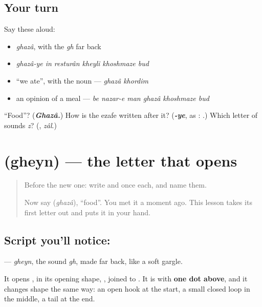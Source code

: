 \subsection*{Your turn}
Say these aloud:

\begin{itemize}
\raggedright
  \item \emph{ghazâ}, with the \emph{gh} far back
  \item \emph{ghazâ-ye in resturân kheyli khoshmaze bud}
  \item \textquotedblleft{}we ate\textquotedblright{}, with the noun — \emph{ghazâ khordim}
  \item an opinion of a meal — \emph{be nazar-e man ghazâ khoshmaze bud}
\end{itemize}

\begin{tcolorbox}[breakable,colback=teal!4,colframe=teal!35!black,title={Before you move on}]
\textquotedblleft{}Food\textquotedblright{}? (\emph{\textbf{Ghazâ.}}) How is the ezafe written after it? (\emph{\textbf{-ye}}, as \textbf{}: \textbf{}.) Which letter of \textbf{} sounds \emph{z}? (\textbf{}, \emph{zâl}.)
\end{tcolorbox}
\section[\texorpdfstring{\fa{غ} (gheyn)}{غ (gheyn)}]{ (gheyn) — the letter that opens }

\label{lesson:FA-W296-gheyn}



\begin{quote}
Before the new one: write  and  once each, and name them.

Now say \textbf{} (\emph{ghazâ}), \textquotedblleft{}food\textquotedblright{}. You met it a moment ago. This lesson takes its first letter out and puts it in your hand.
\end{quote}

\subsection*{Script you'll notice: }
\textbf{} — \emph{gheyn}, the sound \emph{gh}, made far back, like a soft gargle.

It opens \textbf{}, in its opening shape, \textbf{}, joined to \textbf{}. It is \textbf{} with \textbf{one dot above}, and it changes shape the same way: an open hook at the start, a small closed loop in the middle, a tail at the end.


